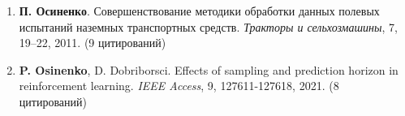 \documentclass{article}
\begin{document}
\begin{enumerate}
\item \textbf{П. Осиненко}. Совершенствование методики обработки данных полевых испытаний наземных транспортных средств. \textit{Тракторы и сельхозмашины}, 7, 19--22, 2011. (9 цитирований)

\item \textbf{P. Osinenko}, D. Dobriborsci. Effects of sampling and prediction horizon in reinforcement learning. \textit{IEEE Access}, 9, 127611-127618, 2021. (8 цитирований)

\end{enumerate}

\end{document}
